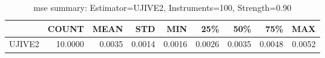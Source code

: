 \begin{table}[ht]
\centering
\caption{mse summary: Estimator=UJIVE2, Instruments=100, Strength=0.90}
\begin{tabular}{lrrrrrrrr}
\toprule
 & COUNT & MEAN & STD & MIN & 25\% & 50\% & 75\% & MAX \\
\midrule
UJIVE2 & 10.0000 & 0.0035 & 0.0014 & 0.0016 & 0.0026 & 0.0035 & 0.0048 & 0.0052 \\
\bottomrule
\end{tabular}
\end{table}
